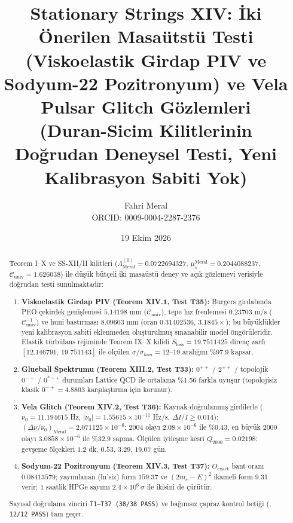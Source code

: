 \documentclass[12pt,a4paper]{article}
\title{\textbf{Stationary Strings XIV: İki Önerilen Masaütstü Testi (Viskoelastik Girdap PIV ve Sodyum-22 Pozitronyum) ve Vela Pulsar Glitch Gözlemleri} \\[0.3cm]
\large (Duran-Sicim Kilitlerinin Doğrudan Deneysel Testi, Yeni Kalibrasyon Sabiti Yok)}
\author{Fahri Meral\\[0.2em]\small ORCID: 0009-0004-2287-2376}
\date{19 Ekim 2026}
\begin{document}
\shorthandoff{=}

\maketitle

\begin{abstract}
Teorem I--X ve SS-XII/II kilitleri
($\Lambda_{\mathrm{Meral}}^{(0)}=0.0722694327$,
$\mu_s^{\mathrm{Meral}}=0.2044088237$,
$\mathcal{C}_{\mathrm{univ}}=1.626038$)
ile düşük bütçeli iki masaüstü deney ve açık
gözlemevi verisiyle doğrudan testi sunulmaktadır:
\begin{enumerate}
    \item \textbf{Viskoelastik Girdap PIV (Teorem XIV.1, Test T35):}
    Burgers girdabında PEO çekirdek genişlemesi $5.14198$ mm
    ($\mathcal{C}_{\mathrm{univ}}$), tepe hız frenlemesi $0.23703$ m/s
    ($\mathcal{C}_{\mathrm{univ}}^{-1}$) ve huni bastırması $8.09603$ mm
    (oran $0.31402536$, $3.1845\times$); bu büyüklükler yeni kalibrasyon
    sabiti eklenmeden oluşturulmuş sınanabilir model öngörüleridir.
    Elastik türbülans rejiminde Teorem IX--X kilidi $S_{\mathrm{loss}}
    =19.7511425$ direnç zarfı $[12.146791,\,19.751143]$ ile ölçülen
    $\sigma/\sigma_{lam}=12$--$19$ aralığını \%97.9 kapsar.
    \item \textbf{Glueball Spektrumu (Teorem XIII.2, Test T33):}
    $0^{++}$ / $2^{++}$ / topolojik $0^{-+}$ / $0^{*++}$ durumları Lattice QCD
    ile ortalama \%1.56 farkla uyuşur (topolojisiz klasik $0^{-+}=4.8803$
    karşılaştırma için korunur).
    \item \textbf{Vela Glitch (Teorem XIV.2, Test T36):}
    Kaynak-doğrulanmış girdilerle ($\nu_0=11.194615$ Hz,
    $|\dot\nu_0|=1.55615\times10^{-11}$ Hz/s, $\Delta I/I\ge 0.014$):
    $(\Delta\nu/\nu_0)_{\mathrm{Meral}}=2.071125\times 10^{-6}$;
    2004 olayı $2.08\times10^{-6}$ ile \%0.43, en büyük 2000 olayı
    $3.0858\times10^{-6}$ ile \%32.9 sapma. Ölçülen iyileşme kesri
    $Q_{2000}=0.02198$; gevşeme ölçekleri $1.2$ dk, $0.53$, $3.29$, $19.07$ gün.
    \item \textbf{Sodyum-22 Pozitronyum (Teorem XIV.3, Test T37):}
    $O_{\mathrm{exact}}$ bant oranı $0.08413579$; yayımlanan (ln'siz)
    form $159.37$ ve $(2m_e-E)^2$ ikameli form $9.31$ verir; 1 saatlik
    HPGe sayımı $2.4\times 10^6\,\sigma$ ile ikisini de çürütür.
\end{enumerate}
Sayısal doğrulama zinciri \texttt{T1--T37 (38/38 PASS)} ve bağımsız çapraz kontrol
betiği (, \texttt{12/12 PASS}) tam geçer.
\end{abstract}
\end{document}
